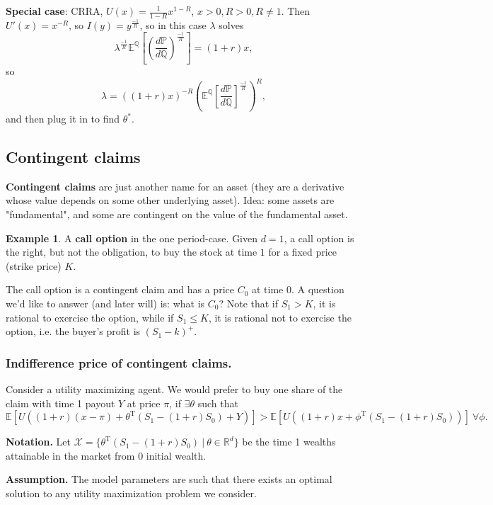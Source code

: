\documentclass{article}
\theoremstyle{definition}
\newtheorem{example}{Example}[section]
\begin{document}
\textbf{Special case}: CRRA, $U(x) = \frac{1}{1-R}x^{1-R}$, $x>0, R>0, R \neq 1$. Then $U'(x)=x^{-R}$, so $I(y)=y^{\frac{-1}{R}}$, so in this case $\lambda$ solves $$\lambda^{\frac{-1}{R}} \mathbb{E}^{\mathbb{Q}}\left[\left(\frac{d \mathbb{P}}{d \mathbb{Q}}\right)^{\frac{-1}{R}}\right] = (1+r)x,$$
so \[
\lambda = ((1+r)x)^{-R}\left( \mathbb{E}^{\mathbb{Q}}\left[\frac{d \mathbb{P}}{d \mathbb{Q}}\right]^{\frac{-1}{R}}\right)^R,
\] and then plug it in to find $\theta^*$.

\subsection{Contingent claims}

\textbf{Contingent claims} are just another name for an asset (they are a derivative whose value depends on some other underlying asset). Idea: some assets are "fundamental", and some are contingent on the value of the fundamental asset.

\begin{example}
    A \textbf{call option} in the one period-case. Given $d=1$, a call option is the right, but not the obligation, to buy the stock at time $1$ for a fixed price (strike price) $K$.
\end{example}
The call option is a contingent claim and has a price $C_0$ at time 0. A question we'd like to answer (and later will) is: what is $C_0$? Note that if $S_1 > K$, it is rational to exercise the option, while if $S_1\le K$, it is rational not to exercise the option, i.e. the buyer's profit is $(S_1-k)^+$.

\subsubsection{Indifference price of contingent claims.} 

Consider a utility maximizing agent. We would prefer to buy one share of the claim with time 1 payout $Y$ at price $\pi$, if $\exists \theta$ such that $$\mathbb{E}[U((1+r)(x-\pi) + \theta^{\text{T}}(S_1 -(1+r)S_0)+ Y)] > \mathbb{E}[U((1+r)x + \phi^{\text{T}}(S_1-(1+r)S_0))] ~\forall \phi.$$

\textbf{Notation.} Let $\mathcal{X} = \{\theta^{\text{T}}(S_1-(1+r)S_0) ~|~ \theta \in \mathbb{R}^d\}$ be the time 1 wealths attainable in the market from 0 initial wealth.
\vspace{1mm}

\textbf{Assumption.} The model parameters are such that there exists an optimal solution to any utility maximization problem we consider.
\end{document}
